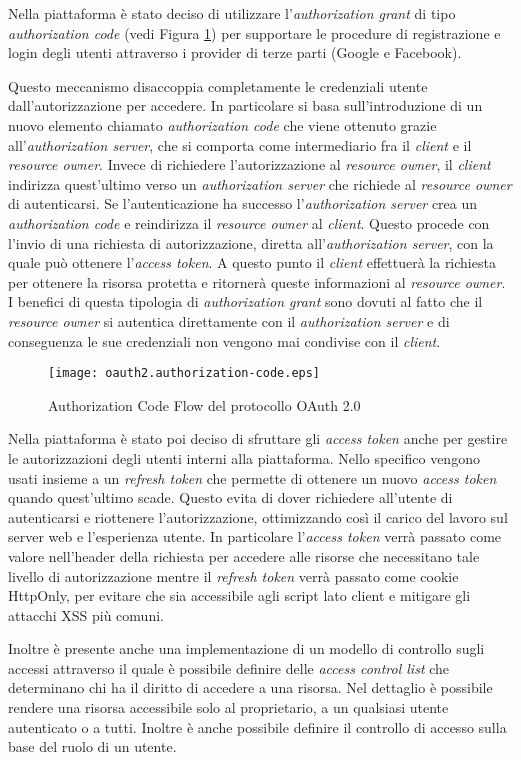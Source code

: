 Nella piattaforma è stato deciso di utilizzare l'\textit{authorization grant} di tipo \textit{authorization code} (vedi Figura \ref{fig:AuthCodeFlow}) per supportare le procedure
di registrazione e login degli utenti attraverso i provider di terze parti (Google e Facebook).

Questo meccanismo disaccoppia completamente le credenziali utente dall'autorizzazione per accedere.
In particolare si basa sull'introduzione di un nuovo elemento chiamato \textit{authorization code}
che viene ottenuto grazie all'\textit{authorization server}, che si comporta come intermediario fra il  \textit{client} e il \textit{resource owner}.
Invece di richiedere l'autorizzazione al \textit{resource owner}, il \textit{client} indirizza quest'ultimo verso un \textit{authorization server} che richiede al \textit{resource owner} di autenticarsi.
Se l'autenticazione ha successo l'\textit{authorization server} crea un \textit{authorization code} e reindirizza il \textit{resource owner} al \textit{client}.
Questo procede con l'invio di una richiesta di autorizzazione, diretta all'\textit{authorization server}, con la quale può ottenere l'\textit{access token}.
A questo punto il \textit{client} effettuerà la richiesta per ottenere la risorsa protetta e ritornerà queste informazioni al \textit{resource owner}.
I benefici di questa tipologia di \textit{authorization grant} sono dovuti al fatto che il \textit{resource owner} si autentica direttamente con il \textit{authorization server}
e di conseguenza le sue credenziali non vengono mai condivise con il \textit{client}.

\begin{figure}[H]
    \centering
    \texttt{[image: oauth2.authorization-code.eps]}
    \caption{Authorization Code Flow del protocollo OAuth 2.0}
    \label{fig:AuthCodeFlow}
\end{figure}

Nella piattaforma è stato poi deciso di sfruttare gli \textit{access token} anche per gestire le autorizzazioni
degli utenti interni alla piattaforma. Nello specifico vengono usati insieme a un \textit{refresh token} che permette
di ottenere un nuovo \textit{access token} quando quest'ultimo scade. Questo evita di dover richiedere all'utente di autenticarsi
e riottenere l'autorizzazione, ottimizzando così il carico del lavoro sul server web e l'esperienza utente.
In particolare l'\textit{access token} verrà passato come valore nell'header della richiesta per accedere alle risorse che necessitano tale livello
di autorizzazione mentre il \textit{refresh token} verrà passato come cookie HttpOnly, per evitare che sia accessibile agli script lato client e mitigare
gli attacchi XSS più comuni.

Inoltre è presente anche una implementazione di un modello di controllo sugli accessi attraverso il quale è possibile definire delle \textit{access control list} che
determinano chi ha il diritto di accedere a una risorsa.
Nel dettaglio è possibile rendere una risorsa accessibile solo al proprietario, a un qualsiasi utente autenticato o a tutti.
Inoltre è anche possibile definire il controllo di accesso sulla base del ruolo di un utente.
